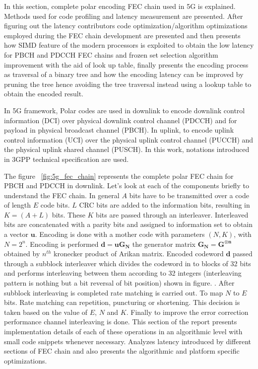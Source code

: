 In this section, complete polar encoding FEC chain used in 5G is explained. Methods used for code profiling and latency measurement are presented. After figuring out the latency contributors code optimization/algorithm optimizations employed during the FEC chain development are presented and then presents how SIMD feature of the modern processors is exploited to obtain the low latency for PBCH and PDCCH FEC chains and frozen set selection algorithm improvement with the aid of look up table, finally presents the encoding process as traversal of a binary tree and how the encoding latency can be improved by pruning the tree hence avoiding the tree traversal instead using a lookup table to obtain the encoded result.

In 5G framework, Polar codes are used in downlink to encode downlink control information (DCI) over physical downlink control channel (PDCCH) and for payload in physical broadcast channel (PBCH). In uplink, to encode uplink control information (UCI) over the physical uplink control channel (PUCCH) and the physical uplink shared channel (PUSCH). In this work, notations introduced in 3GPP technical specification\cite{3gpp.38.212} are used.

The figure ~\ref{fig:5g_fec_chain} represents the complete polar FEC chain for PBCH and PDCCH in downlink. Let's look at each of the components briefly to understand the FEC chain. In general $A$ bits have to be transmitted over a code of length $E$ code bits. $L$ CRC bits are added to the information bits, resulting in  $K = (A + L)$ bits. These $K$ bits are passed through an interleaver. Interleaved bits are concatenated with a parity bits and assigned to information set to obtain a vector $\boldsymbol{u}$. Encoding is done with a mother code with parameters $(N,K)$, with $N = 2^{n}$. Encoding is performed $\boldsymbol{d = uG_{N}}$ the generator matrix $\boldsymbol{G_{N} = G^{\otimes n}}$ obtained by $n^{th}$ kronecker product of Arikan matrix. Encoded codeword $\boldsymbol{d}$ passed through a subblock interleaver which divides the codeword in to blocks of 32 bits and performs interleaving between them according to 32 integers (interleaving pattern is nothing but a bit reversal of bit position) shown in figure. . After subblock interleaving is completed rate matching is carried out. To map $N$ to $E$ bits. Rate matching can repetition, puncturing or shortening. This decision is taken based on the value of $E$, $N$ and $K$. Finally to improve the error correction performance channel interleaving is done. This section of the report presents  implementation details of each of these operations in an algorithmic level with small code snippets whenever necessary. Analyzes latency introduced by different sections of FEC chain and also presents the algorithmic and platform specific optimizations.

